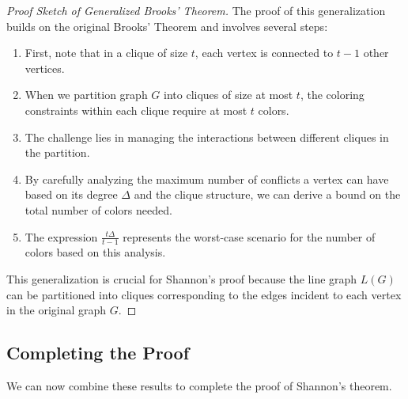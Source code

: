 \documentclass{article}
\theoremstyle{definition}
\begin{document}
\begin{proof}[Proof Sketch of Generalized Brooks' Theorem]
The proof of this generalization builds on the original Brooks' Theorem and involves several steps:

\begin{enumerate}
    \item First, note that in a clique of size $t$, each vertex is connected to $t-1$ other vertices.
    
    \item When we partition graph $G$ into cliques of size at most $t$, the coloring constraints within each clique require at most $t$ colors.
    
    \item The challenge lies in managing the interactions between different cliques in the partition.
    
    \item By carefully analyzing the maximum number of conflicts a vertex can have based on its degree $\Delta$ and the clique structure, we can derive a bound on the total number of colors needed.
    
    \item The expression $\frac{t\Delta}{t-1}$ represents the worst-case scenario for the number of colors based on this analysis.
\end{enumerate}

This generalization is crucial for Shannon's proof because the line graph $L(G)$ can be partitioned into cliques corresponding to the edges incident to each vertex in the original graph $G$.
\end{proof}

\subsection*{Completing the Proof}
We can now combine these results to complete the proof of Shannon's theorem.
\end{document}
